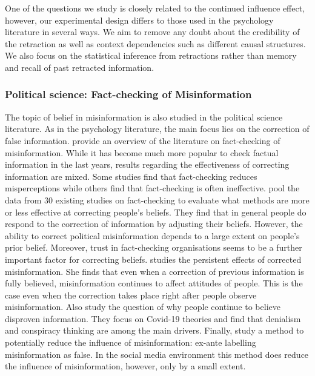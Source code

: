 \documentclass{article}
\begin{document}
One of the questions we study is closely related to the continued influence effect, however, our experimental design differs to those used in the psychology literature in several ways. We aim to remove any doubt about the credibility of the retraction as well as context dependencies such as different causal structures. We also focus on the statistical inference from retractions rather than memory and recall of past retracted information.


\subsubsection*{Political science: Fact-checking of Misinformation}

The topic of belief in misinformation is also studied in the political science literature. As in the psychology literature, the main focus lies on the correction of false information. \cite{Nieminen2018} provide an overview of the literature on fact-checking of misinformation. While it has become much more popular to check factual information in the last years, results regarding the effectiveness of correcting information are mixed. Some studies find that fact-checking reduces misperceptions while others find that fact-checking is often ineffective. \cite{Walter2020} pool the data from 30 existing studies on fact-checking to evaluate what methods are more or less effective at correcting people's beliefs. They find that in general people do respond to the correction of information by adjusting their beliefs. However, the ability to correct political misinformation depends to a large extent on people's prior belief. Moreover, trust in fact-checking organisations seems to be a further important factor for correcting beliefs. \cite{Thorson2015} studies the persistent effects of corrected misinformation. She finds that even when a correction of previous information is fully believed, misinformation continues to affect attitudes of people. This is the case even when the correction takes place right after people observe misinformation. Also \cite{Uscinski2020} study the question of why people continue to believe disproven information. They focus on Covid-19 theories and find that denialism and conspiracy thinking are among the main drivers. Finally, \cite{Clayton2020} study a method to potentially reduce the influence of misinformation: ex-ante labelling misinformation as false. In the social media environment this method does reduce the influence of misinformation, however, only by a small extent. 
\end{document}
